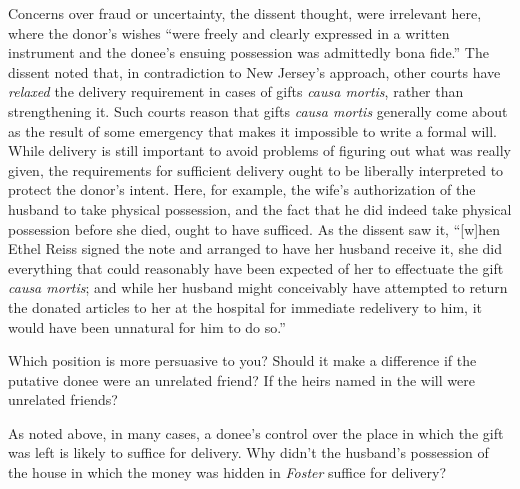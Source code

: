 Concerns over fraud or uncertainty, the dissent thought, were irrelevant here,
where the donor's wishes ``were freely and clearly expressed in a written
instrument and the donee's ensuing possession was admittedly bona fide.''  The
dissent noted that, in contradiction to New Jersey's approach, other courts
have \textit{relaxed} the delivery requirement in cases of gifts \textit{causa
mortis}, rather than strengthening it.  Such courts reason that gifts
\textit{causa mortis} generally come about as the result of some emergency that
makes it impossible to write a formal will.  While delivery is still important
to avoid problems of figuring out what was really given, the requirements for
sufficient delivery ought to be liberally interpreted to protect the donor's
intent.  Here, for example, the wife's authorization of the husband to take
physical possession, and the fact that he did indeed take physical possession
before she died, ought to have sufficed.  As the dissent saw it, ``[w]hen Ethel
Reiss signed the note and arranged to have her husband receive it, she did
everything that could reasonably have been expected of her to effectuate the
gift \textit{causa mortis}; and while her husband might conceivably have
attempted to return the donated articles to her at the hospital for immediate
redelivery to him, it would have been unnatural for him to do so.''

Which position is more persuasive to you?  Should it make a difference if the
putative donee were an unrelated friend?  If the heirs named in the will were
unrelated friends?

As noted above, in many cases, a donee's control over the place in which the
gift was left is likely to suffice for delivery.  Why didn't the husband's
possession of the house in which the money was hidden in \textit{Foster}
suffice for delivery?

